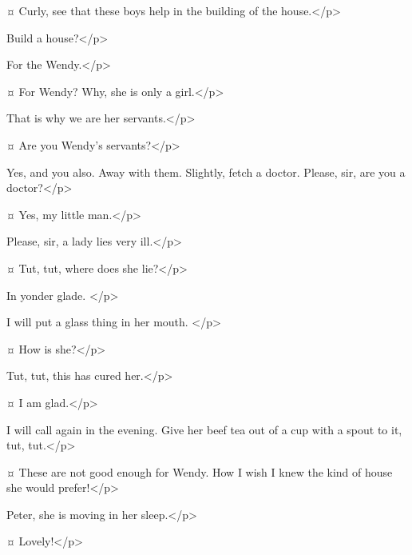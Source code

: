 \peterspeaks {}¤
Curly, see that these boys help in the building of the house.</p>

\johnspeaks
Build a house?</p>

\curlyspeaks
For the Wendy.</p>

\johnspeaks {}¤
For Wendy?
Why, she is only a girl.</p>

\curlyspeaks
That is why we are her servants.</p>

\johnspeaks {}¤
Are you Wendy's servants?</p>

\peterspeaks
Yes, and you also.
Away with them.
Slightly, fetch a doctor.
Please, sir, are you a doctor?</p>

\slightlyspeaks {}¤
Yes, my little man.</p>

\peterspeaks
Please, sir, a lady lies very ill.</p>

\slightlyspeaks {}¤
Tut, tut, where does she lie?</p>

\peterspeaks
In yonder glade.
</p>

\slightlyspeaks
I will put a glass thing in her mouth.
</p>

\peterspeaks {}¤
How is she?</p>

\slightlyspeaks
Tut, tut, this has cured her.</p>

\peterspeaks {}¤
I am glad.</p>

\slightlyspeaks
I will call again in the evening.
Give her beef tea out of a cup with a spout to it, tut, tut.</p>


\peterspeaks {}¤
These are not good enough for Wendy.
How I wish I knew the kind of house she would prefer!</p>

\firsttwinspeaks
Peter, she is moving in her sleep.</p>

\tootlesspeaks {}¤
Lovely!</p>


